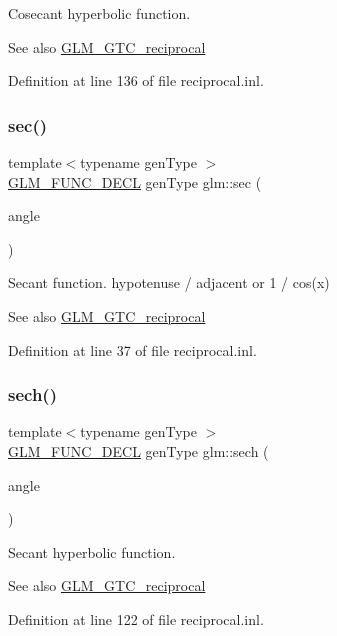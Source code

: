Cosecant hyperbolic function.

\begin{DoxySeeAlso}{See also}
\hyperlink{group__gtc__reciprocal}{G\+L\+M\+\_\+\+G\+T\+C\+\_\+reciprocal} 
\end{DoxySeeAlso}


Definition at line 136 of file reciprocal.\+inl.

\mbox{\label{group__gtc__reciprocal_gabb6829a472da1cc94d88afa6396bed1f}} 
\subsubsection{\texorpdfstring{sec()}{sec()}}
{\footnotesize\ttfamily template$<$typename gen\+Type $>$ \\
\hyperlink{setup_8hpp_ab2d052de21a70539923e9bcbf6e83a51}{G\+L\+M\+\_\+\+F\+U\+N\+C\+\_\+\+D\+E\+CL} gen\+Type glm\+::sec (\begin{DoxyParamCaption}\item[{gen\+Type const \&}]{angle }\end{DoxyParamCaption})}

Secant function. hypotenuse / adjacent or 1 / cos(x)

\begin{DoxySeeAlso}{See also}
\hyperlink{group__gtc__reciprocal}{G\+L\+M\+\_\+\+G\+T\+C\+\_\+reciprocal} 
\end{DoxySeeAlso}


Definition at line 37 of file reciprocal.\+inl.

\mbox{\label{group__gtc__reciprocal_gaaa698b992c63f454a3a1a1baa2773a3c}} 
\subsubsection{\texorpdfstring{sech()}{sech()}}
{\footnotesize\ttfamily template$<$typename gen\+Type $>$ \\
\hyperlink{setup_8hpp_ab2d052de21a70539923e9bcbf6e83a51}{G\+L\+M\+\_\+\+F\+U\+N\+C\+\_\+\+D\+E\+CL} gen\+Type glm\+::sech (\begin{DoxyParamCaption}\item[{gen\+Type const \&}]{angle }\end{DoxyParamCaption})}

Secant hyperbolic function.

\begin{DoxySeeAlso}{See also}
\hyperlink{group__gtc__reciprocal}{G\+L\+M\+\_\+\+G\+T\+C\+\_\+reciprocal} 
\end{DoxySeeAlso}


Definition at line 122 of file reciprocal.\+inl.

